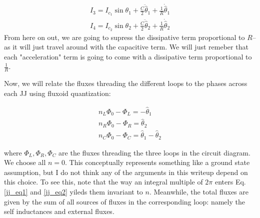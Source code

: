 \documentclass[paper=a4, twocolumn, fontsize=10pt]{article} %
\numberwithin{equation}{section} %
\numberwithin{figure}{section} %
\numberwithin{table}{section} %
\def \df#1{\hat{#1}}
\def \dl#1{#1}
\begin{document}
\begin{align}
    I_3 = I_{c_1} \sin \dl\theta_1 + \frac{C}{2} \ddot{\df \theta}_1 + \frac{1}{R} \dot{ \df \theta }_1
    \\ 
    I_4 = I_{c_2} \sin \dl\theta_2 + \frac{C}{2} \ddot{\df \theta}_2 + \frac{1}{R} \dot{ \df \theta}_2
    \end{align}
From here on out, we are going to supress the dissipative term proportional to $R$-- as it will just travel around with the capacitive term. We will just remeber that each "acceleration" term is going to come with a dissipative term proportional to $\frac{1}{R}$.

Now, we will relate the fluxes threading the different loops to the phases across each JJ using fluxoid quantization:

\begin{align}
     n_L\Phi_0 - \Phi_L = -\df\theta_1
    \\ 
    n_R \Phi_0 -  \Phi_R = \df\theta_2
    \\
    n_C \Phi_0 - \Phi_{C} = \df\theta_1  - \df\theta_2
\end{align}

where $\Phi_L, \Phi_R, \Phi_{C}$ are the fluxes threading the three loops in the circuit diagram. We choose all $n=0$. This conceptually represents something like a ground state assumption, but I do not think any of the arguments in this writeup depend on this choice. To see this, note that the way an integral multiple of $2\pi$ enters Eq. \ref{jj_eq1} and \ref{jj_eq2} yileds them invariant to $n$. Meanwhile, the total fluxes are given by the sum of all sources of fluxes in the corresponding loop: namely the self inductances and external fluxes.
\end{document}
